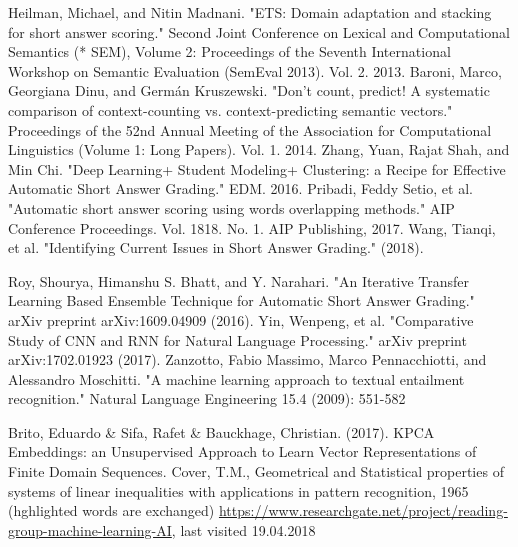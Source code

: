 \documentclass[rnd]{mas_report}
\begin{document}
\begin{thebibliography}{3}
 Heilman, Michael, and Nitin Madnani. "ETS: Domain adaptation and stacking for short answer scoring." Second Joint Conference on Lexical and Computational Semantics (* SEM), Volume 2: Proceedings of the Seventh International Workshop on Semantic Evaluation (SemEval 2013). Vol. 2. 2013.
  Baroni, Marco, Georgiana Dinu, and Germán Kruszewski. "Don't count, predict! A systematic comparison of context-counting vs. context-predicting semantic vectors." Proceedings of the 52nd Annual Meeting of the Association for Computational Linguistics (Volume 1: Long Papers). Vol. 1. 2014.
 Zhang, Yuan, Rajat Shah, and Min Chi. "Deep Learning+ Student Modeling+ Clustering: a Recipe for Effective Automatic Short Answer Grading." EDM. 2016.
 Pribadi, Feddy Setio, et al. "Automatic short answer scoring using words overlapping methods." AIP Conference Proceedings. Vol. 1818. No. 1. AIP Publishing, 2017.
 Wang, Tianqi, et al. "Identifying Current Issues in Short Answer Grading." (2018).


 Roy, Shourya, Himanshu S. Bhatt, and Y. Narahari. "An Iterative Transfer Learning Based Ensemble Technique for Automatic Short Answer Grading." arXiv preprint arXiv:1609.04909 (2016).
 Yin, Wenpeng, et al. "Comparative Study of CNN and RNN for Natural Language Processing." arXiv preprint arXiv:1702.01923 (2017).
 Zanzotto, Fabio Massimo, Marco Pennacchiotti, and Alessandro Moschitti. "A machine learning approach to textual entailment recognition." Natural Language Engineering 15.4 (2009): 551-582


 Brito, Eduardo \& Sifa, Rafet \& Bauckhage, Christian. (2017). KPCA Embeddings: an Unsupervised Approach to Learn Vector Representations of Finite Domain Sequences.
 Cover, T.M., Geometrical and Statistical properties of systems of linear inequalities with applications in pattern recognition, 1965 (hghlighted words are exchanged)
 \url{https://www.researchgate.net/project/reading-group-machine-learning-AI}, last visited 19.04.2018


\end{thebibliography}
\end{document}

